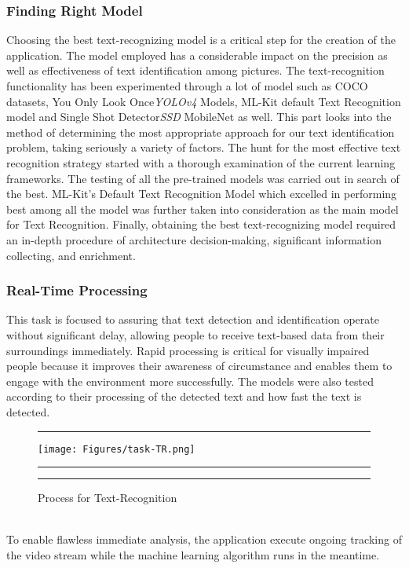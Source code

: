 \documentclass[MScCS]{uccthesis}
\begin{document}
\subsubsection{Finding Right Model}
Choosing the best text-recognizing model is a critical step for the creation of the application. The model employed has a considerable impact on the precision as well as effectiveness of text identification among pictures. The text-recognition functionality has been experimented through a lot of model such as COCO datasets, You Only Look Once\textit{YOLOv4} Models, ML-Kit default Text Recognition model and Single Shot Detector\textit{SSD} MobileNet as well. This part looks into the method of determining the most appropriate approach for our text identification problem, taking seriously a variety of factors. The hunt for the most effective text recognition strategy started with a thorough examination of the current learning frameworks. The testing of all the pre-trained models was carried out in search of the best. ML-Kit's Default Text Recognition Model which excelled in performing best among all the model was further taken into consideration as the main model for Text Recognition. Finally, obtaining the best text-recognizing model required an in-depth procedure of architecture decision-making, significant information collecting, and enrichment.
\subsubsection{Real-Time Processing}
This task is focused to assuring that text detection and identification operate without significant delay, allowing people to receive text-based data from their surroundings immediately. Rapid processing is critical for visually impaired people because it improves their awareness of circumstance and enables them to engage with the environment more successfully. The models were also tested according to their processing of the detected text and how fast the text is detected. 
\begin{figure}[hbtp]
      \hrule
      \vspace{0.5em}
     \centering
      \texttt{[image: Figures/task-TR.png]}
      \vspace{0.5em}
      \hrule
      \caption{\label{fig:task-TR}Process for Text-Recognition }
      \vspace{0.5em}
      \hrule
   \end{figure}
   \\
To enable flawless immediate analysis, the application execute ongoing tracking of the video stream while the machine learning algorithm runs in the meantime. 
   
\end{document}
